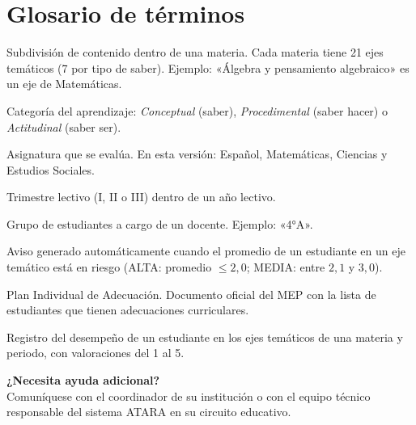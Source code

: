 \documentclass[12pt,a4paper,oneside]{article}
\begin{document}
\section{Glosario de términos}

\begin{description}[leftmargin=3.5cm, style=sameline, font=\bfseries\color{ataraAzul},
                    labelwidth=3.2cm, itemsep=6pt]

  \item[Eje temático]
    Subdivisión de contenido dentro de una materia. Cada materia tiene
    21 ejes temáticos (7 por tipo de saber). Ejemplo: «Álgebra y pensamiento
    algebraico» es un eje de Matemáticas.

  \item[Tipo de saber]
    Categoría del aprendizaje: \emph{Conceptual} (saber), \emph{Procedimental}
    (saber hacer) o \emph{Actitudinal} (saber ser).

  \item[Materia]
    Asignatura que se evalúa. En esta versión: Español, Matemáticas, Ciencias
    y Estudios Sociales.

  \item[Periodo]
    Trimestre lectivo (I, II o III) dentro de un año lectivo.

  \item[Sección]
    Grupo de estudiantes a cargo de un docente. Ejemplo: «4°A».

  \item[Alerta temática]
    Aviso generado automáticamente cuando el promedio de un estudiante en un
    eje temático está en riesgo (ALTA: promedio $\leq 2{,}0$; MEDIA: entre $2{,}1$ y $3{,}0$).

  \item[PIAD]
    Plan Individual de Adecuación. Documento oficial del MEP con la lista de
    estudiantes que tienen adecuaciones curriculares.

  \item[Evaluación por saber]
    Registro del desempeño de un estudiante en los ejes temáticos de una
    materia y periodo, con valoraciones del 1 al 5.

\end{description}

\vspace{1.5cm}

\begin{tcolorbox}[
  colback=ataraAzulPale, colframe=ataraAzul!50,
  arc=4mm, boxrule=0.8pt, halign=center]
{\large\bfseries\color{ataraAzul} ¿Necesita ayuda adicional?}\\[0.4em]
Comuníquese con el coordinador de su institución o con el equipo técnico
responsable del sistema ATARA en su circuito educativo.
\end{tcolorbox}
\end{document}
